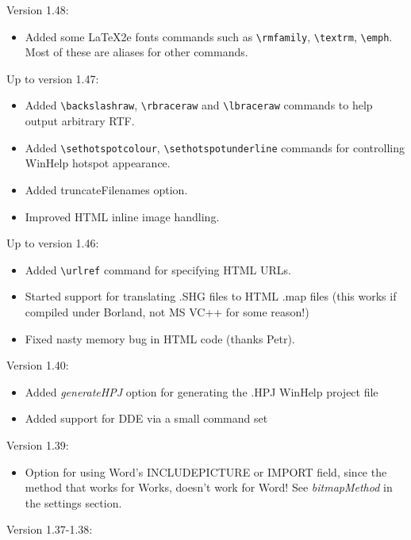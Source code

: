 Version 1.48:

\begin{itemize}\itemsep=0pt
\item Added some LaTeX2e fonts commands such as \verb$\rmfamily$, \verb$\textrm$, \verb$\emph$.
Most of these are aliases for other commands.
\end{itemize}

Up to version 1.47:

\begin{itemize}\itemsep=0pt
\item Added \verb$\backslashraw$, \verb$\rbraceraw$ and \verb$\lbraceraw$ commands
to help output arbitrary RTF.
\item Added \verb$\sethotspotcolour$, \verb$\sethotspotunderline$ commands for controlling
WinHelp hotspot appearance.
\item Added truncateFilenames option.
\item Improved HTML inline image handling.
\end{itemize}

Up to version 1.46:

\begin{itemize}
\itemsep=0pt
\item Added \verb$\urlref$ command for specifying HTML URLs.
\item Started support for translating .SHG files to HTML .map files
(this works if compiled under Borland, not MS VC++ for some reason!)
\item Fixed nasty memory bug in HTML code (thanks Petr).
\end{itemize}

Version 1.40:

\begin{itemize}
\itemsep=0pt
\item Added {\it generateHPJ} option for generating the .HPJ WinHelp project file
\item Added support for DDE via a small command set
\end{itemize}

Version 1.39:

\begin{itemize}
\itemsep=0pt
\item Option for using Word's INCLUDEPICTURE or IMPORT field, since the method that
works for Works, doesn't work for Word! See {\it bitmapMethod} in the
settings section.
\end{itemize}

Version 1.37-1.38:

